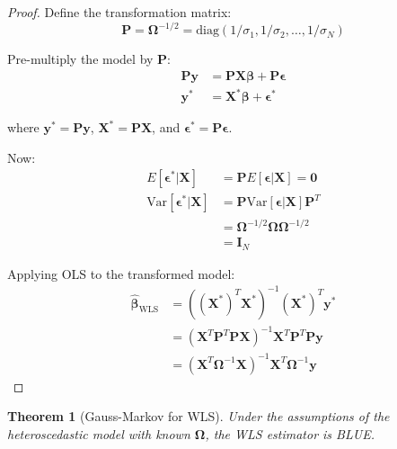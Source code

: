 \documentclass{article}
\newtheorem{theorem}{Theorem}
\begin{document}
\begin{proof}
Define the transformation matrix:
\begin{equation}
\mathbf{P} = \boldsymbol{\Omega}^{-1/2} = \text{diag}(1/\sigma_1, 1/\sigma_2, \ldots, 1/\sigma_N)
\end{equation}

Pre-multiply the model by $\mathbf{P}$:
\begin{align}
\mathbf{P}\mathbf{y} &= \mathbf{P}\mathbf{X}\boldsymbol{\beta} + \mathbf{P}\boldsymbol{\epsilon} \\
\mathbf{y}^* &= \mathbf{X}^*\boldsymbol{\beta} + \boldsymbol{\epsilon}^*
\end{align}

where $\mathbf{y}^* = \mathbf{P}\mathbf{y}$, $\mathbf{X}^* = \mathbf{P}\mathbf{X}$, and $\boldsymbol{\epsilon}^* = \mathbf{P}\boldsymbol{\epsilon}$.

Now:
\begin{align}
E[\boldsymbol{\epsilon}^*|\mathbf{X}] &= \mathbf{P}E[\boldsymbol{\epsilon}|\mathbf{X}] = \mathbf{0} \\
\text{Var}[\boldsymbol{\epsilon}^*|\mathbf{X}] &= \mathbf{P}\text{Var}[\boldsymbol{\epsilon}|\mathbf{X}]\mathbf{P}^T \\
&= \boldsymbol{\Omega}^{-1/2}\boldsymbol{\Omega}\boldsymbol{\Omega}^{-1/2} \\
&= \mathbf{I}_N
\end{align}

Applying OLS to the transformed model:
\begin{align}
\hat{\boldsymbol{\beta}}_{\text{WLS}} &= ((\mathbf{X}^*)^T\mathbf{X}^*)^{-1}(\mathbf{X}^*)^T\mathbf{y}^* \\
&= (\mathbf{X}^T\mathbf{P}^T\mathbf{P}\mathbf{X})^{-1}\mathbf{X}^T\mathbf{P}^T\mathbf{P}\mathbf{y} \\
&= (\mathbf{X}^T\boldsymbol{\Omega}^{-1}\mathbf{X})^{-1}\mathbf{X}^T\boldsymbol{\Omega}^{-1}\mathbf{y}
\end{align}
\end{proof}

\begin{theorem}[Gauss-Markov for WLS]
Under the assumptions of the heteroscedastic model with known $\boldsymbol{\Omega}$, the WLS estimator is BLUE.
\end{theorem}
\end{document}
